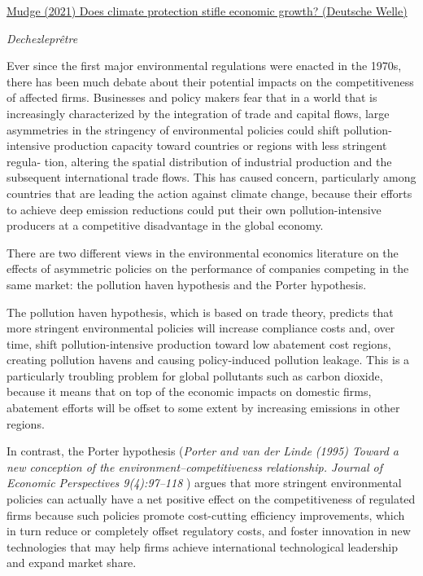 \documentclass[
]{book}
\begin{document}
\href{https://www.dw.com/en/fact-check-does-climate-protection-stifle-economic-growth/a-58104531}{Mudge (2021) Does climate protection stifle economic growth? (Deutsche Welle)}

\emph{Dechezleprêtre}

Ever since the first major environmental regulations were enacted in the 1970s, there has been
much debate about their potential impacts on the competitiveness of affected firms. Businesses
and policy makers fear that in a world that is increasingly characterized by the integration of trade
and capital flows, large asymmetries in the stringency of environmental policies could shift
pollution-intensive production capacity toward countries or regions with less stringent regula-
tion, altering the spatial distribution of industrial production and the subsequent international
trade flows. This has caused concern, particularly among countries that are leading the action
against climate change, because their efforts to achieve deep emission reductions could put their
own pollution-intensive producers at a competitive disadvantage in the global economy.

There are two different views in the environmental economics literature on the effects of
asymmetric policies on the performance of companies competing in the same market: the
pollution haven hypothesis and the Porter hypothesis.

The pollution haven hypothesis, which
is based on trade theory, predicts that more stringent environmental policies will increase
compliance costs and, over time, shift pollution-intensive production toward low abatement
cost regions, creating pollution havens and causing policy-induced pollution leakage.
This is a particularly troubling problem for global pollutants
such as carbon dioxide, because it means that on top of the economic impacts on domestic
firms, abatement efforts will be offset to some extent by increasing emissions in other regions.

In contrast, the Porter hypothesis (\emph{Porter and van der Linde (1995) Toward a new conception of the
environment--competitiveness relationship. Journal of Economic Perspectives 9(4):97--118 }) argues that more
stringent environmental policies can actually have a net positive effect on the competitiveness
of regulated firms because such policies promote cost-cutting efficiency improvements, which
in turn reduce or completely offset regulatory costs, and foster innovation in new technologies
that may help firms achieve international technological leadership and expand market share.
\end{document}
